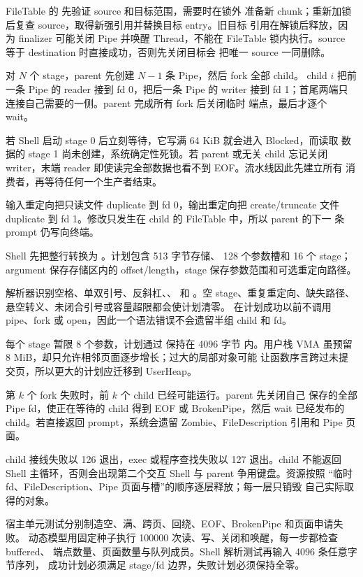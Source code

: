 FileTable 的  先验证 source 和目标范围，需要时在锁外
准备新 chunk；重新加锁后复查 source，取得新强引用并替换目标 entry。旧目标
引用在解锁后释放，因为 finalizer 可能关闭 Pipe 并唤醒 Thread，不能在
FileTable 锁内执行。source 等于 destination 时直接成功，否则先关闭目标会
把唯一 source 一同删除。

对 \(N\) 个 stage，parent 先创建 \(N-1\) 条 Pipe，然后 fork 全部 child。
child \(i\) 把前一条 Pipe 的 reader 接到 fd 0，把后一条 Pipe 的 writer
接到 fd 1；首尾两端只连接自己需要的一侧。parent 完成所有 fork 后关闭临时
端点，最后才逐个 wait。

若 Shell 启动 stage 0 后立刻等待，它写满 64 KiB 就会进入 Blocked，而读取
数据的 stage 1 尚未创建，系统确定性死锁。若 parent 或无关 child 忘记关闭
writer，末端 reader 即使读完全部数据也看不到 EOF。流水线因此先建立所有
消费者，再等待任何一个生产者结束。

输入重定向把只读文件 duplicate 到 fd 0，输出重定向把 create/truncate 文件
duplicate 到 fd 1。修改只发生在 child 的 FileTable 中，所以 parent 的下一
条 prompt 仍写向终端。

Shell 先把整行转换为 。计划包含 513 字节存储、
128 个参数槽和 16 个 stage；argument 保存存储区内的 offset/length，stage
保存参数范围和可选重定向路径。

解析器识别空格、单双引号、反斜杠、\code{|}、\code{<} 和 \code{>}。空
stage、重复重定向、缺失路径、悬空转义、未闭合引号或容量超限都会使计划清零。
在计划成功以前不调用 pipe、fork 或 open，因此一个语法错误不会遗留半组 child
和 fd。

每个 stage 暂限 8 个参数，计划通过  保持在 4096 字节
内。用户栈 VMA 虽预留 8 MiB，却只允许相邻页面逐步增长；过大的局部对象可能
让函数序言跨过未提交页，所以更大的计划应迁移到 UserHeap。

第 \(k\) 个 fork 失败时，前 \(k\) 个 child 已经可能运行。parent 先关闭自己
保存的全部 Pipe fd，使正在等待的 child 得到 EOF 或 BrokenPipe，然后 wait
已经发布的 child。若直接返回 prompt，系统会遗留 Zombie、FileDescription
引用和 Pipe 页面。

child 接线失败以 126 退出，exec 或程序查找失败以 127 退出。child 不能返回
Shell 主循环，否则会出现第二个交互 Shell 与 parent 争用键盘。资源按照
“临时 fd、FileDescription、Pipe 页面与槽”的顺序逐层释放；每一层只销毁
自己实际取得的对象。

宿主单元测试分别制造空、满、跨页、回绕、EOF、BrokenPipe 和页面申请失败。
动态模型用固定种子执行 100000 次读、写、关闭和唤醒，每一步都检查 buffered、
端点数量、页面数量与队列成员。Shell 解析测试再输入 4096 条任意字节序列，
成功计划必须满足 stage/fd 边界，失败计划必须保持全零。

